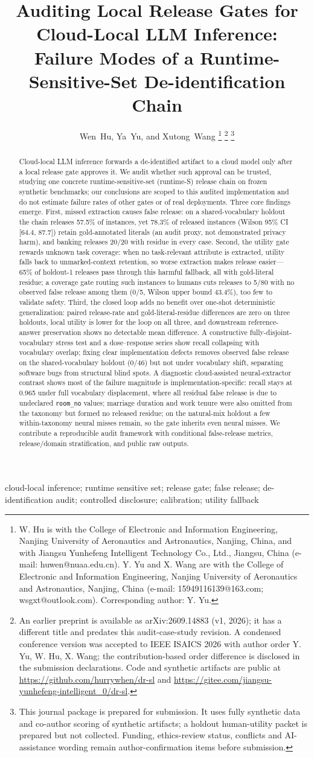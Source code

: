 \documentclass[journal]{IEEEtran}
\title{Auditing Local Release Gates for Cloud-Local LLM Inference:\\
Failure Modes of a Runtime-Sensitive-Set De-identification Chain}
\author{Wen~Hu, Ya~Yu, and Xutong~Wang
\thanks{W. Hu is with the College of Electronic and Information Engineering, Nanjing University of Aeronautics and Astronautics, Nanjing, China, and with Jiangsu Yunhefeng Intelligent Technology Co., Ltd., Jiangsu, China (e-mail: huwen@nuaa.edu.cn). Y. Yu and X. Wang are with the College of Electronic and Information Engineering, Nanjing University of Aeronautics and Astronautics, Nanjing, China (e-mail: 15949116139@163.com; wsgxt@outlook.com). Corresponding author: Y. Yu.}
\thanks{An earlier preprint is available as arXiv:2609.14883 (v1, 2026); it has a different title and predates this audit-case-study revision. A condensed conference version was accepted to IEEE ISAICS 2026 with author order Y. Yu, W. Hu, X. Wang; the contribution-based order difference is disclosed in the submission declarations. Code and synthetic artifacts are public at \url{https://github.com/hurrywhen/dr-sl} and \url{https://gitee.com/jiangsu-yunhefeng-intelligent_0/dr-sl}.}
\thanks{This journal package is prepared for submission. It uses fully synthetic data and co-author scoring of synthetic artifacts; a holdout human-utility packet is prepared but not collected. Funding, ethics-review status, conflicts and AI-assistance wording remain author-confirmation items before submission.}}
\begin{document}
\maketitle

\begin{abstract}
Cloud-local LLM inference forwards a de-identified artifact to a cloud model only after a local release gate approves it. We audit whether such approval can be trusted, studying one concrete runtime-sensitive-set (runtime-S) release chain on frozen synthetic benchmarks; our conclusions are scoped to this audited implementation and do not estimate failure rates of other gates or of real deployments. Three core findings emerge. First, missed extraction causes false release: on a shared-vocabulary holdout the chain releases 57.5\% of instances, yet 78.3\% of released instances (Wilson 95\% CI [64.4, 87.7]) retain gold-annotated literals (an audit proxy, not demonstrated privacy harm), and banking releases 20/20 with residue in every case. Second, the utility gate rewards unknown task coverage: when no task-relevant attribute is extracted, utility falls back to unmarked-context retention, so worse extraction makes release easier---65\% of holdout-1 releases pass through this harmful fallback, all with gold-literal residue; a coverage gate routing such instances to humans cuts releases to 5/80 with no observed false release among them (0/5, Wilson upper bound 43.4\%), too few to validate safety. Third, the closed loop adds no benefit over one-shot deterministic generalization: paired release-rate and gold-literal-residue differences are zero on three holdouts, local utility is lower for the loop on all three, and downstream reference-answer preservation shows no detectable mean difference. A constructive fully-disjoint-vocabulary stress test and a dose--response series show recall collapsing with vocabulary overlap; fixing clear implementation defects removes observed false release on the shared-vocabulary holdout (0/46) but not under vocabulary shift, separating software bugs from structural blind spots. A diagnostic cloud-assisted neural-extractor contrast shows most of the failure magnitude is implementation-specific: recall stays at 0.965 under full vocabulary displacement, where all residual false release is due to undeclared \texttt{room\_no} values; marriage duration and work tenure were also omitted from the taxonomy but formed no released residue; on the natural-mix holdout a few within-taxonomy neural misses remain, so the gate inherits even neural misses. We contribute a reproducible audit framework with conditional false-release metrics, release/domain stratification, and public raw outputs.

\end{abstract}
\begin{IEEEkeywords}
cloud-local inference; runtime sensitive set; release gate; false release; de-identification audit; controlled disclosure; calibration; utility fallback
\end{IEEEkeywords}
\end{document}
